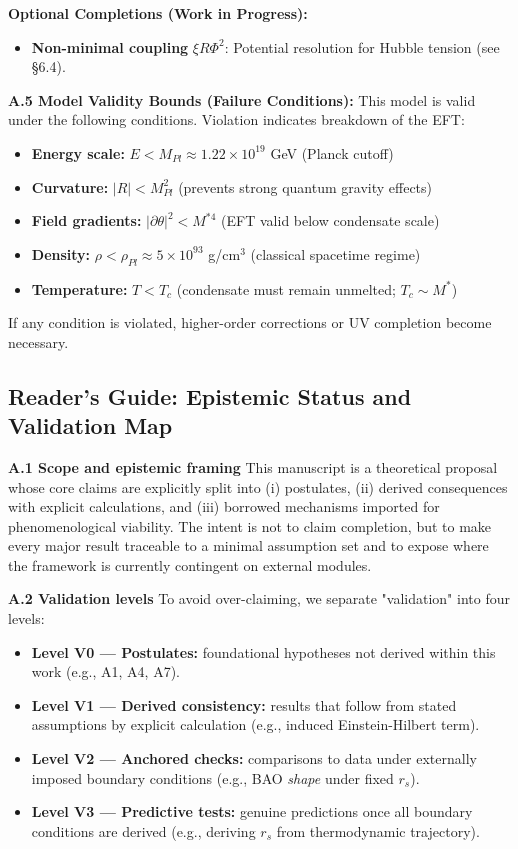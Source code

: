 \documentclass[a4paper,12pt]{article}
\begin{document}
\textbf{Optional Completions (Work in Progress):}
\begin{itemize}
\item \textbf{Non-minimal coupling} $\xi R\Phi^2$: Potential resolution for Hubble tension (see §6.4).
\end{itemize}

\textbf{A.5 Model Validity Bounds (Failure Conditions):}
This model is valid under the following conditions. Violation indicates breakdown of the EFT:
\begin{itemize}
    \item \textbf{Energy scale:} $E < M_{Pl} \approx 1.22 \times 10^{19}$ GeV (Planck cutoff)
    \item \textbf{Curvature:} $|R| < M_{Pl}^2$ (prevents strong quantum gravity effects)
    \item \textbf{Field gradients:} $|\partial\theta|^2 < M^{*4}$ (EFT valid below condensate scale)
    \item \textbf{Density:} $\rho < \rho_{Pl} \approx 5 \times 10^{93}$ g/cm$^3$ (classical spacetime regime)
    \item \textbf{Temperature:} $T < T_c$ (condensate must remain unmelted; $T_c \sim M^*$)
\end{itemize}
If any condition is violated, higher-order corrections or UV completion become necessary.

\subsection{Reader's Guide: Epistemic Status and Validation Map}

\textbf{A.1 Scope and epistemic framing}
This manuscript is a theoretical proposal whose core claims are explicitly split into (i) postulates, (ii) derived consequences with explicit calculations, and (iii) borrowed mechanisms imported for phenomenological viability. The intent is not to claim completion, but to make every major result traceable to a minimal assumption set and to expose where the framework is currently contingent on external modules.

\textbf{A.2 Validation levels}
To avoid over-claiming, we separate "validation" into four levels:
\begin{itemize}
    \item \textbf{Level V0 — Postulates:} foundational hypotheses not derived within this work (e.g., A1, A4, A7).
    \item \textbf{Level V1 — Derived consistency:} results that follow from stated assumptions by explicit calculation (e.g., induced Einstein-Hilbert term).
    \item \textbf{Level V2 — Anchored checks:} comparisons to data under externally imposed boundary conditions (e.g., BAO \emph{shape} under fixed $r_s$).
    \item \textbf{Level V3 — Predictive tests:} genuine predictions once all boundary conditions are derived (e.g., deriving $r_s$ from thermodynamic trajectory).
\end{itemize}
\end{document}
